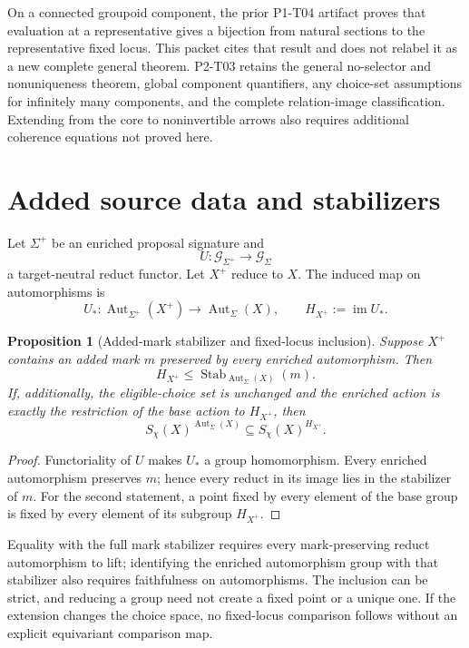 \documentclass[11pt]{article}
\newtheorem{proposition}{Proposition}
\newcommand{\Aut}{\operatorname{Aut}}
\begin{document}
On a connected groupoid component, the prior P1-T04 artifact proves that
evaluation at a representative gives a bijection from natural sections to
the representative fixed locus. This packet cites that result and does not
relabel it as a new complete general theorem. P2-T03 retains the general
no-selector and nonuniqueness theorem, global component quantifiers, any
choice-set assumptions for infinitely many components, and the complete
relation-image classification. Extending from the core to noninvertible
arrows also requires additional coherence equations not proved here.

\section{Added source data and stabilizers}

Let \(\Sigma^+\) be an enriched proposal signature and
\[
 U:\mathcal G_{\Sigma^+}\longrightarrow\mathcal G_\Sigma
\]
a target-neutral reduct functor. Let \(X^+\) reduce to \(X\). The induced
map on automorphisms is
\[
 U_*:\Aut_{\Sigma^+}(X^+)\longrightarrow\Aut_\Sigma(X),
 \qquad H_{X^+}:=\operatorname{im}U_*.
\]

\begin{proposition}[Added-mark stabilizer and fixed-locus inclusion]
Suppose \(X^+\) contains an added mark \(m\) preserved by every enriched
automorphism. Then
\[
 H_{X^+}\leq\operatorname{Stab}_{\Aut_\Sigma(X)}(m).
\]
If, additionally, the eligible-choice set is unchanged and the enriched
action is exactly the restriction of the base action to \(H_{X^+}\), then
\[
 S_\chi(X)^{\Aut_\Sigma(X)}
 \subseteq S_\chi(X)^{H_{X^+}}.
\]
\end{proposition}

\begin{proof}
Functoriality of \(U\) makes \(U_*\) a group homomorphism. Every enriched
automorphism preserves \(m\); hence every reduct in its image lies in the
stabilizer of \(m\). For the second statement, a point fixed by every element
of the base group is fixed by every element of its subgroup \(H_{X^+}\).
\end{proof}

Equality with the full mark stabilizer requires every mark-preserving reduct
automorphism to lift; identifying the enriched automorphism group with that
stabilizer also requires faithfulness on automorphisms. The inclusion can be
strict, and reducing a group need not create a fixed point or a unique one.
If the extension changes the choice space, no fixed-locus comparison follows
without an explicit equivariant comparison map.
\end{document}
